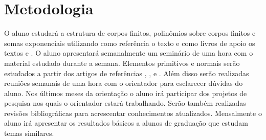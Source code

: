 \documentclass[12pt,twoside]{article}
\begin{document}

  \section{Metodologia}
    O aluno estudará a estrutura de corpos finitos, polinômios sobre corpos finitos e somas
    exponenciais utilizando como referência o texto \cite[Finite fields]{finite-fields-1997} e como livros 
    de apoio os textos \cite[Abstract algebra]{abstract-algebra-2007} e \cite[Tópicos de álgebra]{topicos-de-algebra-1970}. 
    O aluno apresentará semanalmente um seminário de uma hora com o material estudado durante a semana.
    Elementos primitivos e normais serão estudados a partir dos artigos de referências \cite{article-1987}, 
    \cite{article-2014}, \cite{article-2017} e \cite{article-2018}.
    Além disso serão realizadas reuniões semanais de uma hora com o orientador para esclarecer dúvidas
    do aluno. Nos últimos meses da orientação o aluno irá participar dos projetos de pesquisa nos quais
    o orientador estará trabalhando. Serão também realizadas revisões bibliográficas para acrescentar
    conhecimentos atualizados. Mensalmente o aluno irá apresentar os resultados básicos a alunos de
    graduação que estudam temas similares. \\
    

\end{document}
